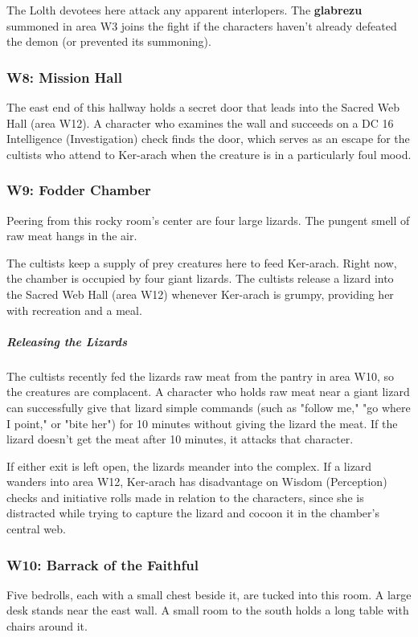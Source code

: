 \documentclass[10pt,a4paper,twoside,bg=print,twocolumn,openany,nodeprecatedcode]{dndbook}
\begin{document}
The Lolth devotees here attack any apparent interlopers. The \textbf{glabrezu} summoned in area W3 joins the fight if the characters haven't already defeated the demon (or prevented its summoning).

\subsubsection{W8: Mission Hall}
The east end of this hallway holds a secret door that leads into the Sacred Web Hall (area W12). A character who examines the wall and succeeds on a DC 16 Intelligence (Investigation) check finds the door, which serves as an escape for the cultists who attend to Ker-arach when the creature is in a particularly foul mood.

\subsubsection{W9: Fodder Chamber}
\begin{DndReadAloud}{}
Peering from this rocky room's center are four large lizards. The pungent smell of raw meat hangs in the air.

\end{DndReadAloud}

The cultists keep a supply of prey creatures here to feed Ker-arach. Right now, the chamber is occupied by four giant lizards. The cultists release a lizard into the Sacred Web Hall (area W12) whenever Ker-arach is grumpy, providing her with recreation and a meal.

\subparagraph{Releasing the Lizards}
The cultists recently fed the lizards raw meat from the pantry in area W10, so the creatures are complacent. A character who holds raw meat near a giant lizard can successfully give that lizard simple commands (such as "follow me," "go where I point," or "bite her") for 10 minutes without giving the lizard the meat. If the lizard doesn't get the meat after 10 minutes, it attacks that character.

If either exit is left open, the lizards meander into the complex. If a lizard wanders into area W12, Ker-arach has disadvantage on Wisdom (Perception) checks and initiative rolls made in relation to the characters, since she is distracted while trying to capture the lizard and cocoon it in the chamber's central web.

\subsubsection{W10: Barrack of the Faithful}
\begin{DndReadAloud}{}
Five bedrolls, each with a small chest beside it, are tucked into this room. A large desk stands near the east wall. A small room to the south holds a long table with chairs around it.

\end{DndReadAloud}
\end{document}
